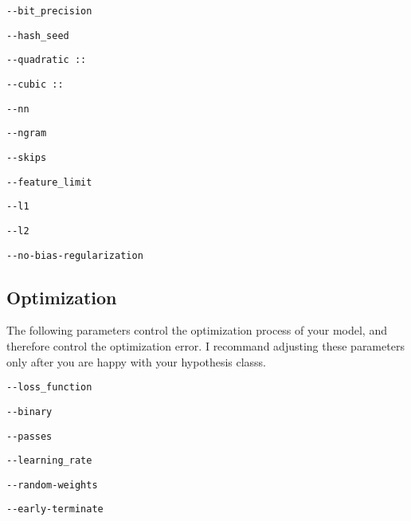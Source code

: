 \documentclass[10pt]{exam}
\theoremstyle{definition}
\begin{document}
    \vspace{1in}
    \lstinline{--bit_precision}

    \vspace{2in}
    \lstinline{--hash_seed}

    \vspace{2in}
    \lstinline{--quadratic ::}

    \vspace{2in}
    \lstinline{--cubic ::}
    
    \vspace{2in}
    \lstinline{--nn}
    
    \vspace{2in}
    \lstinline{--ngram}
    
    \vspace{2in}
    \lstinline{--skips}
    
    \vspace{2in}
    \lstinline{--feature_limit}
    
    \vspace{2in}
    \lstinline{--l1}
    
    \vspace{2in}
    \lstinline{--l2}
    
    \vspace{2in}
    \lstinline{--no-bias-regularization}
    \vspace{1in}

    \newpage
\subsection{Optimization}
    The following parameters control the optimization process of your model,
    and therefore control the optimization error.
    I recommand adjusting these parameters only after you are happy with your hypothesis classs.

    \vspace{0.5in}
    \lstinline{--loss_function}

    \vspace{1in}
    \lstinline{--binary}

    \vspace{1in}
    \lstinline{--passes}

    \vspace{1in}
    \lstinline{--learning_rate}

    \vspace{1in}
    \lstinline{--random-weights}

    \vspace{1in}
    \lstinline{--early-terminate}
\end{document}
